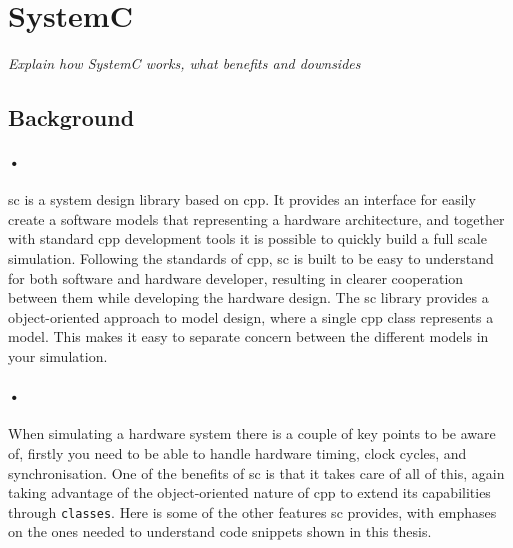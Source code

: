 \documentclass[a4paper]{report}
\newcommand{\codeword}[1]{\texttt{#1}}
\begin{document}
\section{SystemC}
\textit{Explain how SystemC works, what benefits and downsides}

\subsection{Background}
\paragraph{•}
\gls{sc} is a system design library based on \gls{cpp}.
It provides an interface for easily create a software models that representing a hardware architecture, and together with standard \gls{cpp} development tools it is possible to quickly build a full scale simulation.
Following the standards of \gls{cpp}, \gls{sc} is built to be easy to understand for both software and hardware developer, resulting in clearer cooperation between them while developing the hardware design.
The \gls{sc} library provides a object-oriented approach to model design, where a single \gls{cpp} class represents a model.
This makes it easy to separate concern between the different models in your simulation.
\paragraph{•}
When simulating a hardware system there is a couple of key points to be aware of, firstly you need to be able to handle hardware timing, clock cycles, and synchronisation.
One of the benefits of \gls{sc} is that it takes care of all of this, again taking advantage of the object-oriented nature of \gls{cpp} to extend its capabilities through \codeword{classes}.
Here is some of the other features \gls{sc} provides, with emphases on the ones needed to understand code snippets shown in this thesis.
\end{document}
